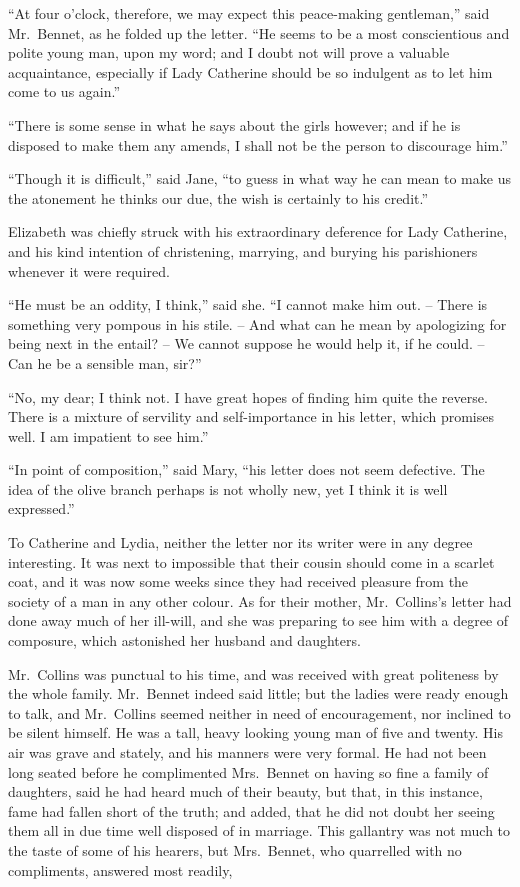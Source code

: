 “At four o’clock, therefore, we may expect this peace-making
gentleman,” said Mr.\ Bennet, as he folded up the
letter. “He seems to be a most conscientious and polite
young man, upon my word; and I doubt not will prove
a valuable acquaintance, especially if Lady Catherine
should be so indulgent as to let him come to us again.”

“There is some sense in what he says about the girls
however; and if he is disposed to make them any amends,
I shall not be the person to discourage him.”

“Though it is difficult,” said Jane, “to guess in what
way he can mean to make us the atonement he thinks
our due, the wish is certainly to his credit.”

Elizabeth was chiefly struck with his extraordinary
deference for Lady Catherine, and his kind intention of
christening, marrying, and burying his parishioners whenever
it were required.

“He must be an oddity, I think,” said she. “I cannot
make him out. -- There is something very pompous in his
stile. -- And what can he mean by apologizing for being
next in the entail? -- We cannot suppose he would help
it, if he could. -- Can he be a sensible man, sir?”

“No, my dear; I think not. I have great hopes of
finding him quite the reverse. There is a mixture of
servility and self-importance in his letter, which promises
well. I am impatient to see him.”

“In point of composition,” said Mary, “his letter does
not seem defective. The idea of the olive branch perhaps
is not wholly new, yet I think it is well expressed.”

To Catherine and Lydia, neither the letter nor its
writer were in any degree interesting. It was next to
impossible that their cousin should come in a scarlet coat,
and it was now some weeks since they had received
pleasure from the society of a man in any other colour.
As for their mother, Mr.\ Collins’s letter had done away
much of her ill-will, and she was preparing to see him
with a degree of composure, which astonished her husband
and daughters.

Mr.\ Collins was punctual to his time, and was received
with great politeness by the whole family. Mr.\ Bennet
indeed said little; but the ladies were ready enough to
talk, and Mr.\ Collins seemed neither in need of encouragement,
nor inclined to be silent himself. He was a tall, heavy
looking young man of five and twenty. His air was grave
and stately, and his manners were very formal. He had
not been long seated before he complimented Mrs.\ Bennet
on having so fine a family of daughters, said he had heard
much of their beauty, but that, in this instance, fame had
fallen short of the truth; and added, that he did not
doubt her seeing them all in due time well disposed of in
marriage. This gallantry was not much to the taste of
some of his hearers, but Mrs.\ Bennet, who quarrelled with
no compliments, answered most readily,

